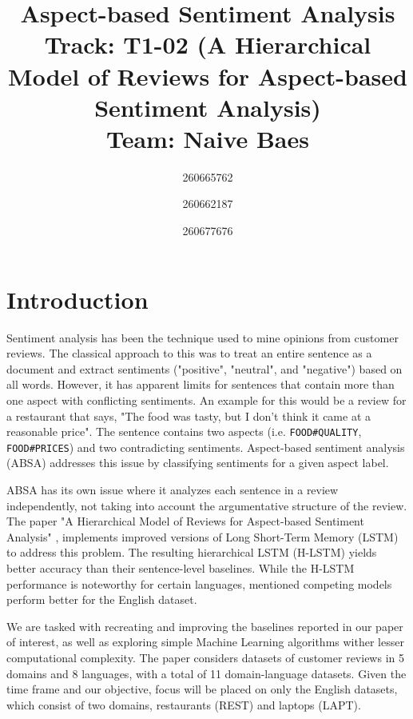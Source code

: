 \documentclass[comsoc,conference]{IEEEtran}
\begin{document}
\title{Aspect-based Sentiment Analysis
	\\ \large{Track: T1-02 (A Hierarchical Model of Reviews for Aspect-based Sentiment Analysis)
	\\ Team: Naive Baes}
}

\author{
	260665762
	\and
	260662187
	\and
	260677676
}

\maketitle


\section{Introduction}

Sentiment analysis has been the technique used to mine opinions from customer reviews. The classical approach to this was to treat an entire sentence as a document and extract sentiments ("positive", "neutral", and "negative") based on all words. However, it has apparent limits for sentences that contain more than one aspect with conflicting sentiments. An example for this would be a review for a restaurant that says, "The food was tasty, but I don't think it came at a reasonable price". The sentence contains two aspects (i.e. \texttt{FOOD\#QUALITY}, \texttt{FOOD\#PRICES}) and two contradicting sentiments. Aspect-based sentiment analysis (ABSA) addresses this issue by classifying sentiments for a given aspect label.

ABSA has its own issue where it analyzes each sentence in a review independently, not taking into account the argumentative structure of the review. The paper "A Hierarchical Model of Reviews for Aspect-based Sentiment Analysis" \cite{T1-P2}, implements improved versions of Long Short-Term Memory (LSTM) to address this problem. The resulting hierarchical LSTM (H-LSTM) yields better accuracy than their sentence-level baselines. While the H-LSTM performance is noteworthy for certain languages, mentioned competing models perform better for the English dataset. 

We are tasked with recreating and improving the baselines reported in our paper of interest, as well as exploring simple Machine Learning algorithms wither lesser computational complexity. The paper considers datasets of customer reviews in 5 domains and 8 languages, with a total of 11 domain-language datasets. Given the time frame and our objective, focus will be placed on only the English datasets, which consist of two domains, restaurants (REST) and laptops (LAPT).
\end{document}
